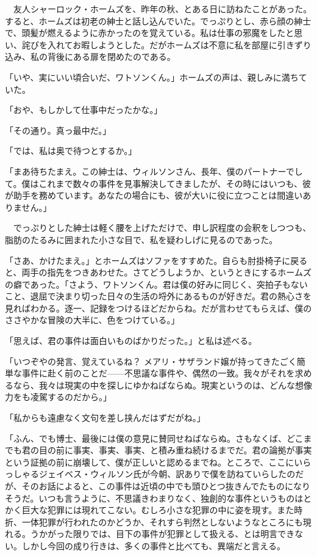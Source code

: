 \documentclass[tate,paper=b6j,jafontsize=9pt]{jlreq}
\begin{document}
\thispagestyle{empty}
\vspace*{\fill}
\zw
{}
\vfill
\newpage

　友人シャーロック・ホームズを、昨年の秋、とある日に訪ねたことがあった。すると、ホームズは初老の紳士と話し込んでいた。でっぷりとし、赤ら顔の紳士で、頭髪が燃えるように赤かったのを覚えている。私は仕事の邪魔をしたと思い、詫びを入れてお暇しようとした。だがホームズは不意に私を部屋に引きずり込み、私の背後にある扉を閉めたのである。

「いや、実にいい頃合いだ、ワトソンくん。」ホームズの声は、親しみに満ちていた。

「おや、もしかして仕事中だったかな。」

「その通り。真っ最中だ。」

「では、私は奥で待つとするか。」

「まあ待ちたまえ。この紳士は、ウィルソンさん、長年、僕のパートナーでして。僕はこれまで数々の事件を見事解決してきましたが、その時にはいつも、彼が助手を務めています。あなたの場合にも、彼が大いに役に立つことは間違いありません。」

　でっぷりとした紳士は軽く腰を上げただけで、申し訳程度の会釈をしつつも、脂肪のたるみに囲まれた小さな目で、私を疑わしげに見るのであった。

「さあ、かけたまえ。」とホームズはソファをすすめた。自らも肘掛椅子に戻ると、両手の指先をつきあわせた。さてどうしようか、というときにするホームズの癖であった。「さよう、ワトソンくん。君は僕の好みに同じく、突拍子もないこと、退屈で決まり切った日々の生活の埒外にあるものが好きだ。君の熱心さを見ればわかる。逐一、記録をつけるほどだからね。だが言わせてもらえば、僕のささやかな冒険の大半に、色をつけている。」

「思えば、君の事件は面白いものばかりだった。」と私は述べる。

「いつぞやの発言、覚えているね？ メアリ・サザランド嬢が持ってきたごく簡単な事件に赴く前のことだ------不思議な事件や、偶然の一致。我々がそれを求めるなら、我々は現実の中を探しにゆかねばならぬ。現実というのは、どんな想像力をも凌駕するのだから。」

「私からも遠慮なく文句を差し挟んだはずだがね。」

「ふん、でも博士、最後には僕の意見に賛同せねばならぬ。さもなくば、どこまでも君の目の前に事実、事実、事実、と積み重ね続けるまでだ。君の論拠が事実という証拠の前に崩壊して、僕が正しいと認めるまでね。ところで、ここにいらっしゃるジェイベス・ウィルソン氏が今朝、訳ありで僕を訪ねていらしたのだが、そのお話によると、この事件は近頃の中でも頭ひとつ抜きんでたものになりそうだ。いつも言うように、不思議きわまりなく、独創的な事件というものはとかく巨大な犯罪には現れてこない。むしろ小さな犯罪の中に姿を現す。また時折、一体犯罪が行われたのかどうか、それすら判然としないようなところにも現れる。うかがった限りでは、目下の事件が犯罪として扱える、とは明言できない。しかし今回の成り行きは、多くの事件と比べても、異端だと言える。
\end{document}
